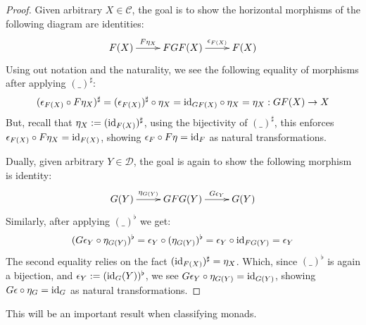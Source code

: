 \documentclass{article}
\begin{document}
\begin{proof}
    Given arbitrary $X\in\mathcal{C}$, the goal is to show the horizontal morphisms of the following diagram are identities:
    \[\xymatrix{
        F(X) \ar[r]^-{F\eta_X} & FGF(X) \ar[r]^-{\epsilon_{F(X)}} & F(X)
    }\]
    Using out notation and the naturality, we see the following equality of morphisms after applying $(\_)^\sharp$:
    \[(\epsilon_{F(X)}\circ F\eta_X)^\sharp = (\epsilon_{F(X)})^\sharp \circ \eta_X = \mathrm{id}_{GF(X)}\circ \eta_X = \eta_X:GF(X)\rightarrow X\]
    But, recall that $\eta_X:= (\mathrm{id}_{F(X)})^\sharp$, using the bijectivity of $(\_)^\sharp$, this enforces $\epsilon_{F(X)}\circ F\eta_X = \mathrm{id}_{F(X)}$, showing $\epsilon_F\circ F\eta=\mathrm{id}_F$ as natural transformations.

    \hfil

    Dually, given arbitrary $Y\in \mathcal{D}$, the goal is again to show the following morphism is identity:
    \[\xymatrix{
        G(Y) \ar[r]^-{\eta_{G(Y)}} & GFG(Y) \ar[r]^-{G\epsilon_{Y}} & G(Y)
    }\]
    Similarly, after applying $(\_)^\flat$ we get:
    \[(G\epsilon_Y\circ \eta_{G(Y)})^\flat = \epsilon_Y\circ (\eta_{G(Y)})^\flat = \epsilon_Y\circ \mathrm{id}_{FG(Y)}= \epsilon_Y\]
    The second equality relies on the fact $(\mathrm{id}_{F(X)})^\sharp = \eta_X$. Which, since $(\_)^\flat$ is again a bijection, and $\epsilon_Y := (\mathrm{id}_G(Y))^\flat$, we see $G\epsilon_Y\circ \eta_{G(Y)}=\mathrm{id}_{G(Y)}$, showing $G\epsilon\circ \eta_{G} = \mathrm{id}_G$ as natural transformations.
\end{proof}

This will be an important result when classifying monads. 

\hfil
\end{document}
